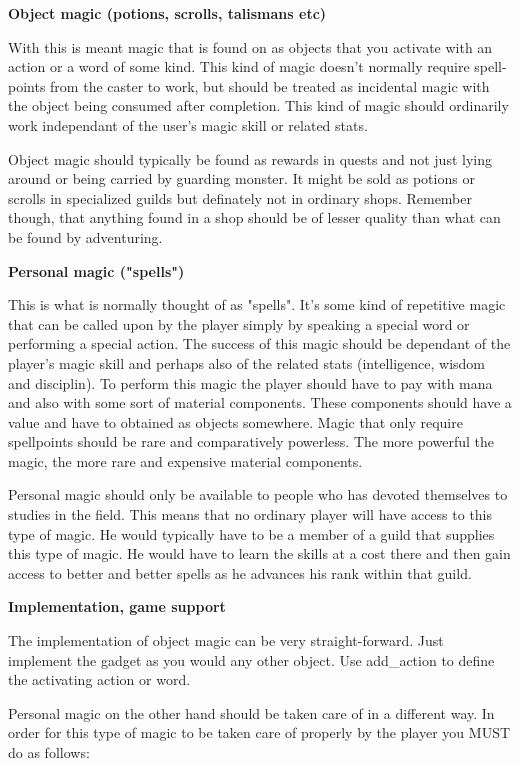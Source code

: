 {\bf Object magic (potions, scrolls, talismans etc)}

With this is meant magic that is found on as objects that you activate
with an action or a word of some kind. This kind of magic doesn't
normally require spell-points from the caster to work, but should be
treated as incidental magic with the object being consumed after
completion. This kind of magic should ordinarily work independant of
the user's magic skill or related stats.

Object magic should typically be found as rewards in quests and not
just lying around or being carried by guarding monster. It might be
sold as potions or scrolls in specialized guilds but definately not in
ordinary shops. Remember though, that anything found in a shop should
be of lesser quality than what can be found by adventuring.

{\bf Personal magic ("spells")}

This is what is normally thought of as "spells". It's some kind of
repetitive magic that can be called upon by the player simply by
speaking a special word or performing a special action. The success of
this magic should be dependant of the player's magic skill and perhaps
also of the related stats (intelligence, wisdom and disciplin). To
perform this magic the player should have to pay with mana and also
with some sort of material components. These components should have a
value and have to obtained as objects somewhere. Magic that only
require spellpoints should be rare and comparatively powerless. The
more powerful the magic, the more rare and expensive material
components.

Personal magic should only be available to people who has devoted
themselves to studies in the field. This means that no ordinary player
will have access to this type of magic. He would typically have to be
a member of a guild that supplies this type of magic. He would have
to learn the skills at a cost there and then gain access to better and
better spells as he advances his rank within that guild.

{\bf Implementation, game support}

The implementation of object magic can be very straight-forward. Just
implement the gadget as you would any other object. Use add\_action to
define the activating action or word.

Personal magic on the other hand should be taken care of in a
different way. In order for this type of magic to be taken care of
properly by the player you MUST do as follows:

